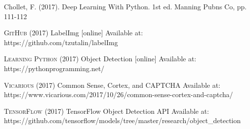 \documentclass[titlepage]{article}
\begin{document}

\begin{thebibliography}{5}

Chollet, F. (2017). Deep Learning With Python. 1st ed. Manning Pubns Co, pp. 111-112

\textsc{GitHub} (2017) LabelImg [online] Available at: https://github.com/tzutalin/labelImg

\textsc{Learning Python} (2017) Object Detection [online] Available at: https://pythonprogramming.net/

\textsc{Vicarious} (2017) Common Sense, Cortex, and CAPTCHA
\newline
[online] Available at: https://www.vicarious.com/2017/10/26/common-sense-cortex-and-captcha/ 

\textsc{TensorFlow} (2017) TensorFlow Object Detection API 
\newline
[online] Available at: https://github.com/tensorflow/models/tree/master/research/object_detection


\end{thebibliography}
\end{document}
